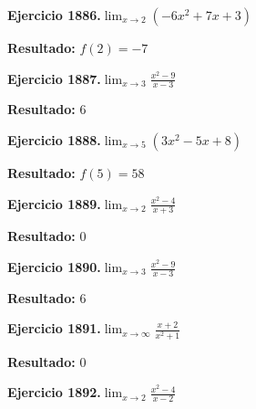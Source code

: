 \documentclass[10pt,a4paper]{article}
\begin{document}
\begin{ejbox}
\textbf{Ejercicio 1886.}\quad $\lim_{x\to 2} (-6x^2 +7x +3)$
\end{ejbox}

\begin{solbox}
\textbf{Resultado:} \(\displaystyle f(2) = -7\)
\end{solbox}

\begin{ejbox}
\textbf{Ejercicio 1887.}\quad $\lim_{x\to 3} \frac{x^2-9}{x-3}$
\end{ejbox}

\begin{solbox}
\textbf{Resultado:} \(\displaystyle 6\)
\end{solbox}

\newpage
\begin{ejbox}
\textbf{Ejercicio 1888.}\quad $\lim_{x\to 5} (3x^2 -5x +8)$
\end{ejbox}

\begin{solbox}
\textbf{Resultado:} \(\displaystyle f(5) = 58\)
\end{solbox}

\begin{ejbox}
\textbf{Ejercicio 1889.}\quad $\lim_{x\to 2} \frac{x^2-4}{x+3}$
\end{ejbox}

\begin{solbox}
\textbf{Resultado:} \(\displaystyle 0\)
\end{solbox}

\begin{ejbox}
\textbf{Ejercicio 1890.}\quad $\lim_{x\to 3} \frac{x^2-9}{x-3}$
\end{ejbox}

\begin{solbox}
\textbf{Resultado:} \(\displaystyle 6\)
\end{solbox}

\newpage
\begin{ejbox}
\textbf{Ejercicio 1891.}\quad $\lim_{x\to \infty} \frac{x + 2}{x^2 + 1}$
\end{ejbox}

\begin{solbox}
\textbf{Resultado:} \(\displaystyle 0\)
\end{solbox}

\begin{ejbox}
\textbf{Ejercicio 1892.}\quad $\lim_{x\to 2} \frac{x^2-4}{x-2}$
\end{ejbox}
\end{document}
